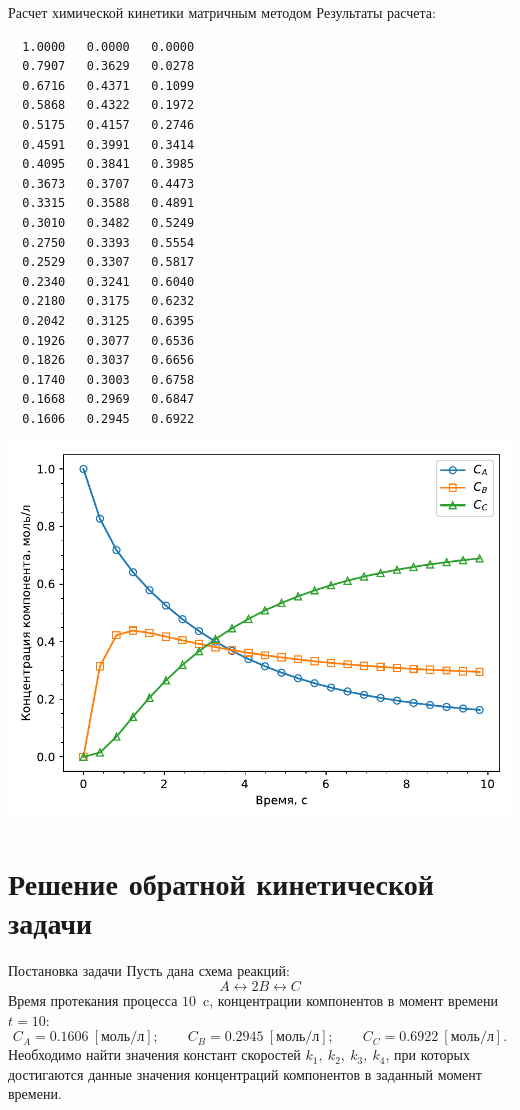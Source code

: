 \documentclass[aspectratio=169, mathserif]{beamer}	%
\begin{document}
\begin{frame}[fragile, label=c]{Расчет химической кинетики матричным методом}
\scriptsize
Результаты расчета:
\vfill
\begin{minipage}{.35\textwidth}
\begin{verbatim}
  1.0000   0.0000   0.0000
  0.7907   0.3629   0.0278
  0.6716   0.4371   0.1099
  0.5868   0.4322   0.1972
  0.5175   0.4157   0.2746
  0.4591   0.3991   0.3414
  0.4095   0.3841   0.3985
  0.3673   0.3707   0.4473
  0.3315   0.3588   0.4891
  0.3010   0.3482   0.5249
  0.2750   0.3393   0.5554
  0.2529   0.3307   0.5817
  0.2340   0.3241   0.6040
  0.2180   0.3175   0.6232
  0.2042   0.3125   0.6395
  0.1926   0.3077   0.6536
  0.1826   0.3037   0.6656
  0.1740   0.3003   0.6758
  0.1668   0.2969   0.6847
  0.1606   0.2945   0.6922
\end{verbatim}
\end{minipage}
\begin{minipage}{.64\textwidth}
\includegraphics[width=\linewidth]{./pics/fig}
\end{minipage}
\vfill
\end{frame}


\section{Решение обратной кинетической задачи}
\begin{frame}[fragile, label=c]{Постановка задачи}
\scriptsize
Пусть дана схема реакций:
\vfill
$$
	A \longleftrightarrow 2B \longleftrightarrow C
$$
\vfill
Время протекания процесса $10$~$\mathrm{c}$, концентрации компонентов в момент времени $t = 10$:
\vfill
$$
	C_A = 0.1606 \ \left[\mathrm{моль/л}\right]; \qquad C_B = 0.2945 \ \left[\mathrm{моль/л}\right]; \qquad C_C = 0.6922 \ \left[\mathrm{моль/л}\right].
$$
\vfill
Необходимо найти значения констант скоростей $k_1, \ k_2, \ k_3, \ k_4$, при которых достигаются данные значения концентраций компонентов в заданный момент времени.
\vfill
\end{frame}
\end{document}
